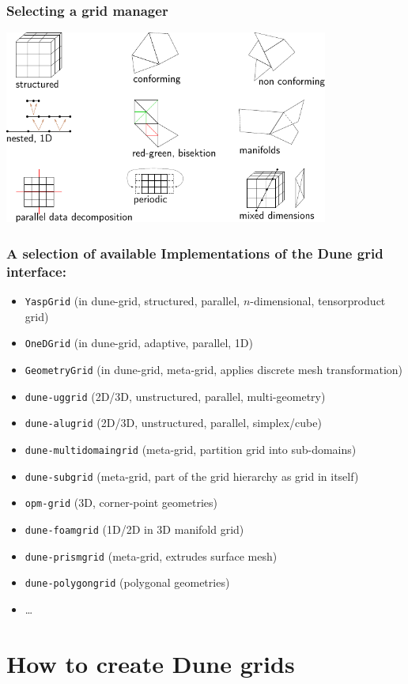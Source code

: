 \documentclass[aspectratio=169,11pt]{beamer}
\theoremstyle{definition}
\begin{document}
\begin{frame}
 \frametitle{Selecting a grid manager}
 \centering
 \includegraphics[width=0.8\textwidth]{figures/io/grids.pdf}
\end{frame}


\begin{frame}
  \frametitle{A selection of available Implementations of the Dune grid interface:}
  \begin{itemize}
  \item \lstinline!YaspGrid! (in dune-grid, structured, parallel, $n$-dimensional, tensorproduct grid)
  \item \lstinline!OneDGrid! (in dune-grid, adaptive, parallel, 1D)
  \item \lstinline!GeometryGrid! (in dune-grid, meta-grid, applies discrete mesh transformation)
  \item \lstinline!dune-uggrid! (2D/3D, unstructured, parallel, multi-geometry)
  \item \lstinline!dune-alugrid! (2D/3D, unstructured, parallel, simplex/cube)
  \item \lstinline!dune-multidomaingrid! (meta-grid, partition grid into sub-domains)
  \item \lstinline!dune-subgrid! (meta-grid, part of the grid hierarchy as grid in itself)
  \item \lstinline!opm-grid! (3D, corner-point geometries)
  \item \lstinline!dune-foamgrid! (1D/2D in 3D manifold grid)
  \item \lstinline!dune-prismgrid! (meta-grid, extrudes surface mesh)
  \item \lstinline!dune-polygongrid! (polygonal geometries)
  \item \ldots{}
  \end{itemize}
\end{frame}

\section{How to create Dune grids}
\end{document}
